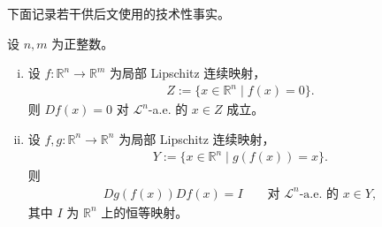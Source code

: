 \documentclass[../../main.tex]{subfiles}%
\begin{document}
下面记录若干供后文使用的技术性事实。

\begin{theorem}[水平集上的可微性]\label{theorem:ch03-3-3}
设 $n,m$ 为正整数。
\begin{enumerate}[(i)]
\item 设 $f:\mathbb{R}^n\to\mathbb{R}^m$ 为局部 Lipschitz 连续映射，
\begin{align*}
Z:=\{x\in\mathbb{R}^n\mid f(x)=0\}.
\end{align*}
则 $Df(x)=0$ 对 $\mathcal{L}^n$-a.e. 的 $x\in Z$ 成立。
\item 设 $f,g:\mathbb{R}^n\to\mathbb{R}^n$ 为局部 Lipschitz 连续映射，
\begin{align*}
Y:=\{x\in\mathbb{R}^n\mid g(f(x))=x\}.
\end{align*}
则
\begin{align*}
Dg(f(x))Df(x)=I\qquad\text{对 } \mathcal{L}^n\text{-a.e. 的 } x\in Y,
\end{align*}
其中 $I$ 为 $\mathbb{R}^n$ 上的恒等映射。
\end{enumerate}
\end{theorem}
\end{document}
